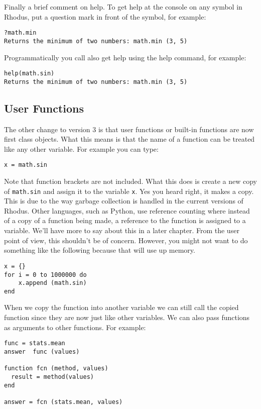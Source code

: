 Finally a brief comment on help. To get help at the console on any symbol in Rhodus, put a question mark in front of the symbol, for example:

\begin{lstlisting}
?math.min
Returns the minimum of two numbers: math.min (3, 5)
\end{lstlisting}

Programmatically you call also get help using the help command, for example:

\begin{lstlisting}
help(math.sin)
Returns the minimum of two numbers: math.min (3, 5)
\end{lstlisting}


\subsection{User Functions}

The other change to version 3 is that user functions or built-in functions are now first class objects. What this means is that the name of a function can be treated like any other variable. For example you can type:


\begin{lstlisting}
x = math.sin
\end{lstlisting}

Note that function brackets are not included. What this does is create a new copy of {\tt math.sin} and assign it to the variable {\tt x}. Yes you heard right, it makes a copy. This is due to the way garbage collection is handled in the current versions of Rhodus. Other languages, such as Python, use reference counting where instead of a copy of a function being made, a reference to the function is assigned to a variable. We'll have more to say about this in a later chapter. From the user point of view, this shouldn't be of concern. However, you might not want to do something like the following because that will use up memory.

\begin{lstlisting}
x = {}
for i = 0 to 1000000 do
    x.append (math.sin)
end
\end{lstlisting}

When we copy the function into another variable we can still call the copied function since they are now just like other variables. We can also pass functions as arguments to other functions. For example:

\begin{lstlisting}
func = stats.mean
answer  func (values)

function fcn (method, values)
  result = method(values)
end

answer = fcn (stats.mean, values)
\end{lstlisting}

